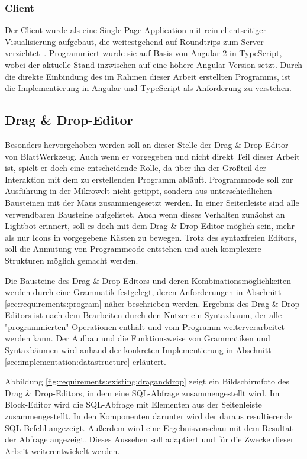 \subsubsection{Client}

Der Client wurde als eine Single-Page Application mit rein clientseitiger Visualisierung aufgebaut, die weitestgehend auf Roundtrips zum Server verzichtet~\cite[94-95]{riemer2016}. Programmiert wurde sie auf Basis von Angular 2 in TypeScript, wobei der aktuelle Stand inzwischen auf eine höhere Angular-Version setzt. Durch die direkte Einbindung des im Rahmen dieser Arbeit erstellten Programms, ist die Implementierung in Angular und TypeScript als Anforderung zu verstehen.

\subsection{Drag \& Drop-Editor}
\label{sec:requirements:existing:structure:drag-drop}

Besonders hervorgehoben werden soll an dieser Stelle der Drag \& Drop-Editor von BlattWerkzeug. Auch wenn er vorgegeben und nicht direkt Teil dieser Arbeit ist, spielt er doch eine entscheidende Rolle, da über ihn der Großteil der Interaktion mit dem zu erstellenden Programm abläuft. Programmcode soll zur Ausführung in der Mikrowelt nicht getippt, sondern aus unterschiedlichen Bausteinen mit der Maus zusammengesetzt werden. In einer Seitenleiste sind alle verwendbaren Bausteine aufgelistet. Auch wenn dieses Verhalten zunächst an Lightbot erinnert, soll es doch mit dem Drag \& Drop-Editor möglich sein, mehr als nur Icons in vorgegebene Kästen zu bewegen. Trotz des syntaxfreien Editors, soll die Anmutung von Programmcode entstehen und auch komplexere Strukturen möglich gemacht werden.

Die Bausteine des Drag \& Drop-Editors und deren Kombinationsmöglichkeiten werden durch eine Grammatik festgelegt, deren Anforderungen in Abschnitt \ref{sec:requirements:program} näher beschrieben werden. Ergebnis des Drag \& Drop-Editors ist nach dem Bearbeiten durch den Nutzer ein Syntaxbaum, der alle "programmierten" Operationen enthält und vom Programm weiterverarbeitet werden kann. Der Aufbau und die Funktionsweise von Grammatiken und Syntaxbäumen wird anhand der konkreten Implementierung in Abschnitt \ref{sec:implementation:datastructure} erläutert.

Abbildung \ref{fig:requirements:existing:draganddrop} zeigt ein Bildschirmfoto des Drag \& Drop-Editors, in dem eine SQL-Abfrage zusammengestellt wird. Im Block-Editor wird die SQL-Abfrage mit Elementen aus der Seitenleiste zusammengestellt. In den Komponenten darunter wird der daraus resultierende SQL-Befehl angezeigt. Außerdem wird eine Ergebnisvorschau mit dem Resultat der Abfrage angezeigt. Dieses Aussehen soll adaptiert und für die Zwecke dieser Arbeit weiterentwickelt werden.

